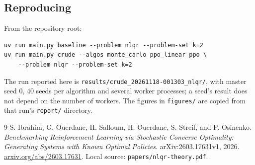 \documentclass[11pt]{article}
\begin{document}
\subsection{Reproducing}

From the repository root:
\begin{verbatim}
uv run main.py baseline --problem nlqr --problem-set k=2
uv run main.py crude --algos monte_carlo ppo_linear ppo \
    --problem nlqr --problem-set k=2
\end{verbatim}
The run reported here is \texttt{results/crude\_20261118-001303\_nlqr/}, with master seed 0, 40 seeds
per algorithm and several worker processes; a seed's result does not depend on the number of
workers.
The figures in \texttt{figures/} are copied from that run's \texttt{report/} directory.

\clearpage
{}
{}
\begin{thebibliography}{9}
S. Ibrahim, G. Ouerdane, H. Salloum, H. Ouerdane, S. Streif, and P. Osinenko.
\emph{Benchmarking Reinforcement Learning via Stochastic Converse Optimality:
Generating Systems with Known Optimal Policies}. arXiv:2603.17631v1, 2026.
\href{https://arxiv.org/abs/2603.17631}{arxiv.org/abs/2603.17631}.
Local source: \texttt{papers/nlqr-theory.pdf}.
\end{thebibliography}
\end{document}
